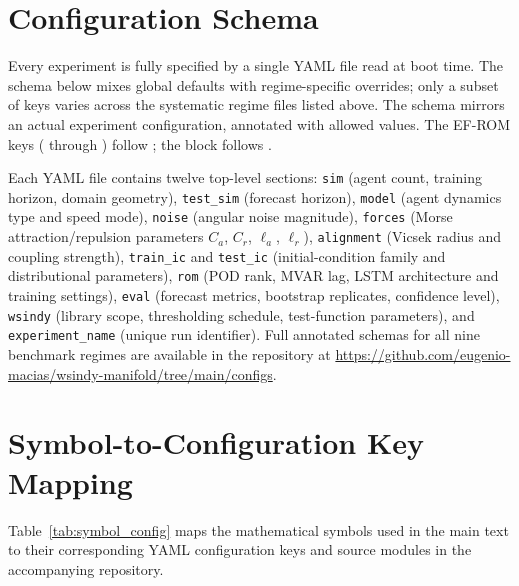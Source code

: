 \section{Configuration Schema}
\label{app:config_schema}

Every experiment is fully specified by a single YAML file read at boot time.
The schema below mixes global defaults with regime-specific
overrides; only a subset of keys varies across the systematic regime files
listed above.
The schema mirrors an actual experiment configuration,
annotated with allowed values.
The EF-ROM keys ( through ) follow
; the  block follows
.

Each YAML file contains twelve top-level sections:
\texttt{sim} (agent count, training horizon, domain geometry),
\texttt{test\_sim} (forecast horizon),
\texttt{model} (agent dynamics type and speed mode),
\texttt{noise} (angular noise magnitude),
\texttt{forces} (Morse attraction/repulsion parameters $C_a$, $C_r$, $\ell_a$, $\ell_r$),
\texttt{alignment} (Vicsek radius and coupling strength),
\texttt{train\_ic} and \texttt{test\_ic} (initial-condition family and distributional parameters),
\texttt{rom} (POD rank, MVAR lag, LSTM architecture and training settings),
\texttt{eval} (forecast metrics, bootstrap replicates, confidence level),
\texttt{wsindy} (library scope, thresholding schedule, test-function parameters),
and \texttt{experiment\_name} (unique run identifier).
Full annotated schemas for all nine benchmark regimes are
available in the repository at
\url{https://github.com/eugenio-macias/wsindy-manifold/tree/main/configs}.

\section{Symbol-to-Configuration Key Mapping}
\label{app:symbol_config_map}

Table~\ref{tab:symbol_config} maps the mathematical symbols used in the
main text to their corresponding YAML configuration keys and source
modules in the accompanying repository.

